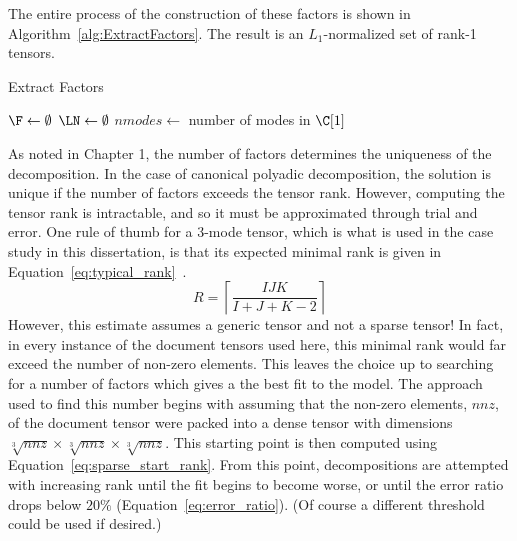 \documentclass[../ut-dissertation.tex]{subfiles}
\begin{document}
The entire process of the construction of these factors is shown in
Algorithm~\ref{alg:ExtractFactors}.  The result is an $L_1$-normalized
set of rank-1 tensors.  
\begin{algorithm}
  \caption{Extract Factors}
  \label{alg:ExtractFactors}
    
   
  \Output{\LN, \F}
  \BlankLine
  $\F \leftarrow \emptyset$\;
  $\LN \leftarrow \emptyset$\;
  $nmodes \leftarrow$ number of modes in $\C[1]$\;
  \Return{\LN, \F}
\end{algorithm}

As noted in Chapter 1, the number of factors determines the uniqueness
of the decomposition.  In the case of canonical polyadic
decomposition, the solution is unique if the number of factors exceeds
the tensor rank.  However, computing the tensor rank is intractable,
and so it must be approximated through trial and error.  One rule of
thumb for a 3-mode tensor, which is what is used in the case study in
this dissertation, is that its expected minimal rank is given in
Equation~\ref{eq:typical_rank}~\cite{comon2009}.
\begin{equation} \label{eq:typical_rank}
  R = \left\lceil \displaystyle\frac{IJK}{I+J+K-2} \right\rceil
\end{equation}
However, this estimate assumes a generic tensor and not a sparse
tensor!  In fact, in every instance of the document tensors used here,
this minimal rank would far exceed the number of non-zero elements.
This leaves the choice up to searching for a number of factors which
gives a the best fit to the model.  The approach used to find this
number begins with assuming that the non-zero elements, $nnz$, of the
document tensor were packed into a dense tensor with dimensions
$\sqrt[3]{nnz} \times \sqrt[3]{nnz} \times \sqrt[3]{nnz}$.  This
starting point is then computed using
Equation~\ref{eq:sparse_start_rank}.  From this point, decompositions
are attempted with increasing rank until the fit begins to become
worse, or until the error ratio drops below $20\%$
(Equation~\ref{eq:error_ratio}).  (Of course a different threshold
could be used if desired.)
\end{document}
